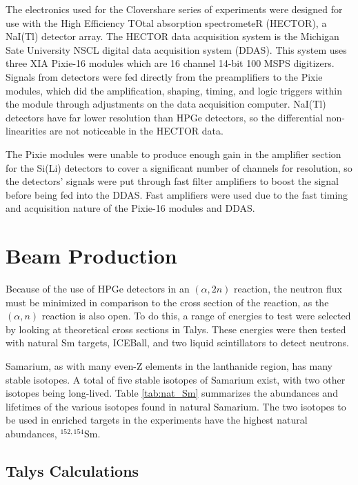 The electronics used for the Clovershare series of experiments were designed for use with the High Efficiency TOtal absorption spectrometeR (HECTOR), a NaI(Tl) detector array\citep{reingold19:_HECTOR}. The HECTOR data acquisition system is the Michigan Sate University NSCL digital data acquisition system (DDAS). This system uses three XIA Pixie-16 modules \citep{xia:_pixie} which are 16 channel 14-bit 100 MSPS digitizers. Signals from detectors were fed directly from the preamplifiers to the Pixie modules, which did the amplification, shaping, timing, and logic triggers within the module through adjustments on the data acquisition computer. NaI(Tl) detectors have far lower resolution than HPGe detectors, so the differential non-linearities are not noticeable in the HECTOR data.

The Pixie modules were unable to produce enough gain in the amplifier section for the Si(Li) detectors to cover a significant number of channels for resolution, so the detectors' signals were put through fast filter amplifiers \citep{ortec:_fastamp} to boost the signal before being fed into the DDAS. Fast amplifiers were used due to the fast timing and acquisition nature of the Pixie-16 modules and DDAS. 

\section{Beam Production}

Because of the use of HPGe detectors in an $(\alpha,2n)$ reaction, the neutron flux must be minimized in comparison to the cross section of the reaction, as the $(\alpha,n)$ reaction is also open. To do this, a range of energies to test were selected by looking at theoretical cross sections in Talys\citep{koning07:_talys}. These energies were then tested with natural Sm targets, ICEBall, and two liquid scintillators to detect neutrons.

Samarium, as with many even-Z elements in the lanthanide region, has many stable isotopes. A total of five stable isotopes of Samarium exist, with two other isotopes being long-lived. Table \ref{tab:nat_Sm} summarizes the abundances and lifetimes of the various isotopes found in natural Samarium. The two isotopes to be used in enriched targets in the experiments have the highest natural abundances, $^{152,154}$Sm.



\subsection{Talys Calculations}

